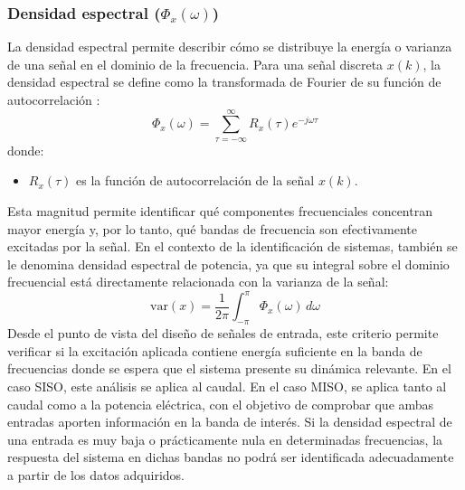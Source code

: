 \documentclass[11pt]{report}
\begin{document}



\subsubsection{Densidad espectral ($\Phi_x(\omega)$) }

La densidad espectral permite describir cómo se distribuye la energía o varianza de una señal en el dominio de la frecuencia. Para una señal discreta $x(k)$, la densidad espectral se define como la transformada de Fourier de su función de autocorrelación \cite{ljung1999system}:
\begin{equation} \label{densidadespectral} 
\Phi_x(\omega)=\sum\limits_{\tau=-\infty}^{\infty} R_x(\tau)e^{-j\omega\tau} 
\end{equation}
 donde:
 \begin{itemize}
     \item $R_x(\tau)$ es la función de autocorrelación de la señal $x(k)$.
 \end{itemize}

Esta magnitud permite identificar qué componentes frecuenciales concentran mayor energía y, por lo tanto, qué bandas de frecuencia son efectivamente excitadas por la señal. En el contexto de la identificación de sistemas, también se le denomina densidad espectral de potencia, ya que su integral sobre el dominio frecuencial está directamente relacionada con la varianza de la señal:
\begin{equation} \label{varianza} 
\text{var}(x) = \frac{1}{2\pi} \int_{-\pi}^{\pi} \Phi_x(\omega) \, d\omega
\end{equation}
Desde el punto de vista del diseño de señales de entrada, este criterio permite verificar si la excitación aplicada contiene energía suficiente en la banda de frecuencias donde se espera que el sistema presente su dinámica relevante. En el caso SISO, este análisis se aplica al caudal. En el caso MISO, se aplica tanto al caudal como a la potencia eléctrica, con el objetivo de comprobar que ambas entradas aporten información en la banda de interés. Si la densidad espectral de una entrada es muy baja o prácticamente nula en determinadas frecuencias, la respuesta del sistema en dichas bandas no podrá ser identificada adecuadamente a partir de los datos adquiridos.
\end{document}
